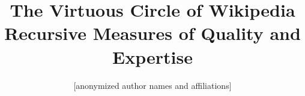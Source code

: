 \documentclass{sigchi}
\begin{document}
\title{The Virtuous Circle of Wikipedia\\ \vspace{0.3cm} {\LARGE \bf Recursive Measures of Quality and Expertise}\\ \vspace{0.3cm}}

\author{[anonymized author names and affiliations]}




\maketitle




\end{document}
